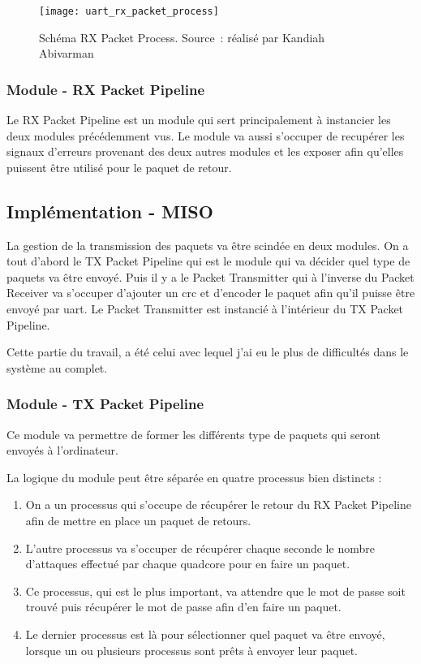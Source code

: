 \begin{figure}[tbph!]
	\centering
	\texttt{[image: uart\_rx\_packet\_process]}
	\caption[Schéma RX Packet Process]{Schéma RX Packet Process. Source : réalisé par Kandiah Abivarman}
	\label{fig:uart_rx_packet_process}
\end{figure}

\subsubsection{Module - RX Packet Pipeline}

Le RX Packet Pipeline est un module qui sert principalement à instancier les deux modules précédemment vus.
Le module va aussi s'occuper de recupérer les signaux d'erreurs provenant des deux autres modules et les exposer afin qu'elles puissent être utilisé pour le paquet de retour.   

\subsection{Implémentation - MISO}

La gestion de la transmission des paquets va être scindée en deux modules.
On a tout d'abord le TX Packet Pipeline qui est le module qui va décider quel type de paquets va être envoyé.
Puis il y a le Packet Transmitter qui à l'inverse du Packet Receiver va s'occuper d'ajouter un \gls{crc} et d'encoder le paquet afin qu'il puisse être envoyé par \gls{uart}. 
Le Packet Transmitter est instancié à l'intérieur du TX Packet Pipeline.

Cette partie du travail, a été celui avec lequel j'ai eu le plus de difficultés dans le système au complet.

\newpage

\subsubsection{Module - TX Packet Pipeline}

Ce module va permettre de former les différents type de paquets qui seront envoyés à l’ordinateur.

La logique du module peut être séparée en quatre processus bien distincts :
\begin{enumerate}
	\item On a un processus qui s’occupe de récupérer le retour du RX Packet Pipeline afin de mettre en place un paquet de retours.
	\item L’autre processus va s’occuper de récupérer chaque seconde le nombre d’attaques effectué par chaque quadcore pour en faire un paquet.
	\item Ce processus, qui est le plus important, va attendre que le mot de passe soit trouvé puis récupérer le mot de passe afin d’en faire un paquet.
	\item Le dernier processus est là pour sélectionner quel paquet va être envoyé, lorsque un ou plusieurs processus sont prêts à envoyer leur paquet.
\end{enumerate}

